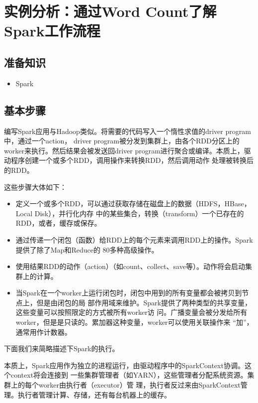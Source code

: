 \section{实例分析：通过Word
Count了解Spark工作流程}\label{ux5b9eux4f8bux5206ux6790ux901aux8fc7word-countux4e86ux89e3sparkux5de5ux4f5cux6d41ux7a0b}

\subsection{准备知识}\label{ux51c6ux5907ux77e5ux8bc6}

\begin{itemize}
\itemsep1pt\parskip0pt
\item
  Spark
\end{itemize}

\subsection{基本步骤}\label{ux57faux672cux6b65ux9aa4}

编写Spark应用与Hadoop类似。将需要的代码写入一个惰性求值的driver
program中，通过一个action， driver
program被分发到集群上，由各个RDD分区上的worker来执行。然后结果会被发送回driver
program进行聚合或编译。本质上，驱动程序创建一个或多个RDD，调用操作来转换RDD，然后调用动作
处理被转换后的RDD。

这些步骤大体如下：

\begin{itemize}
\item
  定义一个或多个RDD，可以通过获取存储在磁盘上的数据（HDFS，HBase，Local
  Disk），并行化内存
  中的某些集合，转换（transform）一个已存在的RDD，或者，缓存或保存。
\item
  通过传递一个闭包（函数）给RDD上的每个元素来调用RDD上的操作。Spark提供了除了Map和Reduce的
  80多种高级操作。
\item
  使用结果RDD的动作（action）（如count、collect、save等）。动作将会启动集群上的计算。
\item
  当Spark在一个worker上运行闭包时，闭包中用到的所有变量都会被拷贝到节点上，但是由闭包的局
  部作用域来维护。Spark提供了两种类型的共享变量，这些变量可以按照限定的方式被所有worker访
  问。广播变量会被分发给所有worker，但是是只读的。累加器这种变量，worker可以使用关联操作来
  ``加''，通常用作计数器。
\end{itemize}

下面我们来简略描述下Spark的执行。

本质上，Spark应用作为独立的进程运行，由驱动程序中的SparkContext协调。这个context将会连接到
一些集群管理者（如YARN），这些管理者分配系统资源。集群上的每个worker由执行者（executor）管
理，执行者反过来由SparkContext管理。执行者管理计算、存储，还有每台机器上的缓存。

